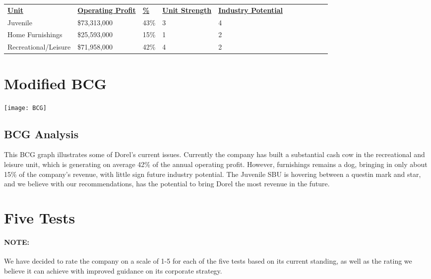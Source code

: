 {\begin{table}[h]
    \begin{tabular}{lllllllllll}
    {\bf \underline{Unit}}             &  {\bf \underline{Operating Profit}} & {\bf \underline{\%}}  & {\bf \underline{Unit Strength}} & {\bf \underline{Industry Potential}} \\
    Juvenile             & \$73,313,000     & 43\% & 3 & 4 \\
    Home Furnishings     & \$25,593,000     & 15\% & 1 & 2 \\
    Recreational/Leisure  & \$71,958,000     & 42\% & 4 & 2 \\
    \end{tabular}
\end{table}
\section{Modified BCG}
\label{chp:bcg}
\centerline{\texttt{[image: BCG]}}
\subsection{BCG Analysis}
This BCG graph illustrates some of Dorel's current issues.  Currently the company has built a substantial cash cow in the recreational and leisure unit, which is generating on average 42\% of the annual operating profit.  However, furnishings remains a dog, bringing in only about 15\% of the company's revenue, with little sign future industry potential.  The Juvenile SBU is hovering between a questin mark and star, and we believe with our recommendations, has the potential to bring Dorel the most revenue in the future.

\section{Five Tests}
\label{chp:tests}
\paragraph{NOTE:}We have decided to rate the company on a scale of 1-5 for each of the five tests based on its current standing, as well as the rating we believe it can achieve with improved guidance on its corporate strategy.



}
